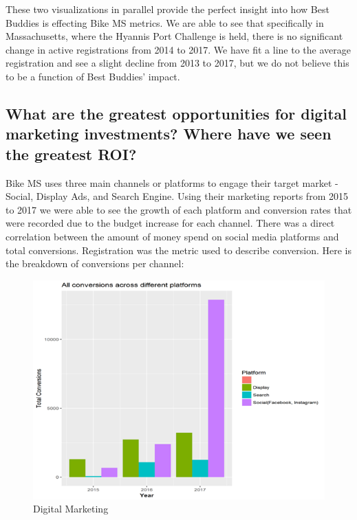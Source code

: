 \documentclass[]{article}
\begin{document}
These two visualizations in parallel provide the perfect insight into
how Best Buddies is effecting Bike MS metrics. We are able to see that
specifically in Massachusetts, where the Hyannis Port Challenge is held,
there is no significant change in active registrations from 2014 to
2017. We have fit a line to the average registration and see a slight
decline from 2013 to 2017, but we do not believe this to be a function
of Best Buddies' impact.

\hypertarget{what-are-the-greatest-opportunities-for-digital-marketing-investments-where-have-we-seen-the-greatest-roi}{%
\subsection{What are the greatest opportunities for digital marketing
investments? Where have we seen the greatest
ROI?}\label{what-are-the-greatest-opportunities-for-digital-marketing-investments-where-have-we-seen-the-greatest-roi}}

Bike MS uses three main channels or platforms to engage their target
market - Social, Display Ads, and Search Engine. Using their marketing
reports from 2015 to 2017 we were able to see the growth of each
platform and conversion rates that were recorded due to the budget
increase for each channel. There was a direct correlation between the
amount of money spend on social media platforms and total conversions.
Registration was the metric used to describe conversion. Here is the
breakdown of conversions per channel:

\begin{figure}
\centering
\includegraphics{digitalmarketing.png}
\caption{Digital Marketing}
\end{figure}
\end{document}

